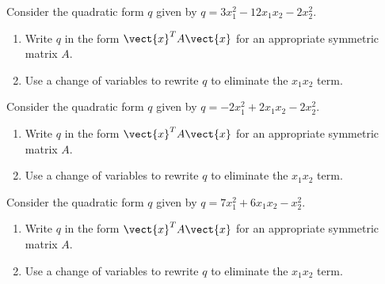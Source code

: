 \begin{ex} Consider the quadratic form $q$ given by $q = 3x_1^2 -12x_1x_2 - 2x_2^2$.\begin{enumerate}
\item Write $q$ in the form $\vect{x}^TA\vect{x}$ for an appropriate symmetric matrix $A$.
\item Use a change of variables to rewrite $q$ to eliminate the $x_1x_2$ term.
\end{enumerate}
\end{ex}

\begin{ex} Consider the quadratic form $q$ given by $q = -2x_1^2 + 2x_1x_2 - 2x_2^2$.
\begin{enumerate}
\item Write $q$ in the form $\vect{x}^TA\vect{x}$ for an appropriate symmetric matrix $A$.
\item Use a change of variables to rewrite $q$ to eliminate the $x_1x_2$ term.
\end{enumerate}
\end{ex}

\begin{ex} Consider the quadratic form $q$ given by $q = 7x_1^2 + 6x_1x_2 - x_2^2$.
\begin{enumerate}
\item Write $q$ in the form $\vect{x}^TA\vect{x}$ for an appropriate symmetric matrix $A$.
\item Use a change of variables to rewrite $q$ to eliminate the $x_1x_2$ term.
\end{enumerate}
\end{ex}

